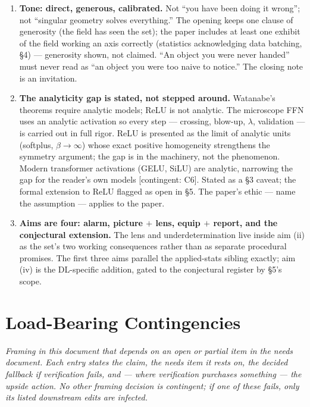 \documentclass[11pt]{article}
\begin{document}
\begin{enumerate}[label=(\alph*), itemsep=6pt]
\item \textbf{Tone: direct, generous, calibrated.} Not ``you have been
doing it wrong''; not ``singular geometry solves everything.'' The
opening keeps one clause of generosity (the field has seen the set); the
paper includes at least one exhibit of the field working an axis
correctly (statistics acknowledging data batching, \S4) --- generosity
shown, not claimed. ``An object you were never handed'' must never
read as ``an object you were too naive to notice.'' The closing note is
an invitation.

\item \textbf{The analyticity gap is stated, not stepped around.}
Watanabe's theorems require analytic models; ReLU is not analytic. The
microscope FFN uses an analytic activation so every step --- crossing,
blow-up, $\lambda$, validation --- is carried out in full rigor. ReLU is
presented as the limit of analytic units (softplus, $\beta\to\infty$)
whose exact positive homogeneity strengthens the symmetry argument; the
gap is in the machinery, not the phenomenon. Modern transformer
activations (GELU, SiLU) are analytic, narrowing the gap for the
reader's own models [contingent: C6]. Stated as a \S3 caveat; the formal
extension to ReLU flagged as open in \S5. The paper's ethic --- name the
assumption --- applies to the paper.

\item \textbf{Aims are four: alarm, picture $+$ lens, equip $+$
report, and the conjectural extension.} The lens and underdetermination
live inside aim (ii) as the set's two working consequences rather than
as separate procedural promises. The first three aims parallel the
applied-stats sibling exactly; aim (iv) is the DL-specific addition,
gated to the conjectural register by \S5's scope.

\end{enumerate}

\section{Load-Bearing Contingencies}

\noindent\emph{Framing in this document that depends on an open or
partial item in the needs document. Each entry states the claim, the
needs item it rests on, the decided fallback if verification fails, and
--- where verification purchases something --- the upside action. No
other framing decision is contingent; if one of these fails, only its
listed downstream edits are infected.}
\end{document}
